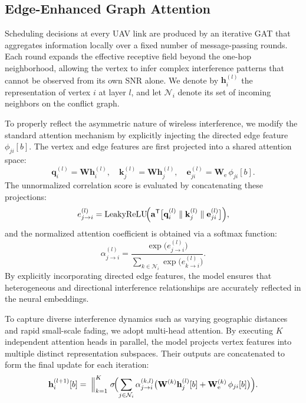 \documentclass[letterpaper,journal]{IEEEtran}
\begin{document}
	\subsection{Edge-Enhanced Graph Attention}
	\label{ssec:gat_attention}
	
	Scheduling decisions at every UAV link are produced by an iterative GAT that aggregates information locally over a fixed number of message-passing rounds. Each round expands the effective receptive field beyond the one-hop neighborhood, allowing the vertex to infer complex interference patterns that cannot be observed from its own SNR alone. We denote by $\mathbf{h}_i^{(l)}$ the representation of vertex $i$ at layer $l$, and let $\mathcal{N}_i$ denote its set of incoming neighbors on the conflict graph.
	
	To properly reflect the asymmetric nature of wireless interference, we modify the standard attention mechanism by explicitly injecting the directed edge feature $\phi_{ji}[b]$. The vertex and edge features are first projected into a shared attention space:
	\[
	\mathbf{q}_i^{(l)} = \mathbf{W}\mathbf{h}_i^{(l)}, \quad
	\mathbf{k}_j^{(l)} = \mathbf{W}\mathbf{h}_j^{(l)}, \quad
	\mathbf{e}_{ji}^{(l)} = \mathbf{W}_{\mathrm{e}}\, \phi_{ji}[b].
	\]
	The unnormalized correlation score is evaluated by concatenating these projections:
	\begin{equation}
		e^{(l)}_{j\to i} = \mathrm{LeakyReLU}\!\Bigl( \mathbf{a}^{\mathsf{T}} \bigl[ \mathbf{q}_i^{(l)} \;\Vert\; \mathbf{k}_j^{(l)} \;\Vert\; \mathbf{e}_{ji}^{(l)} \bigr] \Bigr),
		\label{eq:gat_attention_score}
	\end{equation}
	and the normalized attention coefficient is obtained via a softmax function:
	\begin{equation}
		\alpha^{(l)}_{j\to i} = \frac{\exp\bigl(e^{(l)}_{j\to i}\bigr)}{\sum_{k \in \mathcal{N}_i} \exp\bigl(e^{(l)}_{k \to i}\bigr)}.
		\label{eq:gat_attention}
	\end{equation}
	By explicitly incorporating directed edge features, the model ensures that heterogeneous and directional interference relationships are accurately reflected in the neural embeddings.
	
	To capture diverse interference dynamics such as varying geographic distances and rapid small-scale fading, we adopt multi-head attention. By executing $K$ independent attention heads in parallel, the model projects vertex features into multiple distinct representation subspaces. Their outputs are concatenated to form the final update for each iteration:
	\begin{equation}
		\mathbf{h}_i^{(l+1)}[b] = \;\Big\Vert_{k=1}^{K}\; \sigma\!\Bigl( \sum_{j \in \mathcal{N}_i} \alpha^{(k,l)}_{j\to i} \bigl( \mathbf{W}^{(k)} \mathbf{h}_j^{(l)}[b] + \mathbf{W}_{\mathrm{e}}^{(k)}\, \phi_{ji}[b] \bigr) \Bigr).
		\label{eq:gat_multihead}
	\end{equation}
	
\end{document}
